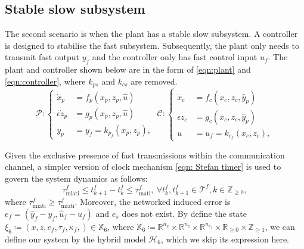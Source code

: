 \subsection{Stable slow subsystem}
The second scenario is when the plant has a stable slow subsystem. A controller is designed to stabilise the fast subsystem.
Subsequently, the plant only needs to transmit fast output $y_f$ and the controller only has fast control input $u_f$. 
The plant and controller shown below are in the form of \eqref{eqn:plant} and \eqref{eqn:controller}, where $k_{ps} $ and $k_{cs}$ are removed.
\begin{equation*}
    \mathcal{P}\!:\!
    \begin{cases}
    \dot x_p \!\!\!\!\!\!&= f_p(x_p, z_p,\hat u)\\
    \epsilon \dot z_p\!\!\!\!\!\! &= g_p(x_p, z_p, \hat u) \\
    y_p \!\!\!\!\!\!&= y_f = k_{p_f}(x_p,z_p)  , 
    \end{cases} \;
    \mathcal{C}\!:\!
    \begin{cases}
    \dot x_c \!\!\!\!\!\!&= f_c(x_c, z_c, \hat{y}_p)\\
    \epsilon \dot z_c \!\!\!\!\!\!&= g_c(x_c, z_c, \hat y_p) \\
    u \!\!\!\!\!\!&= u_f = k_{c_f}(x_c,z_c) ,
    \end{cases}
\end{equation*}

Given the exclusive presence of fast transmissions within the communication channel, a simpler version of clock mechanism \eqref{eqn: Stefan timer} is used to govern the system dynamics as follows:
\begin{equation*}
    \tau_{\text{miati}}^f \leq t_{k+1}^f - t_k^f \leq \tau_{\text{mati}}^f, \ \forall t_k^f, t_{k+1}^f\in \mathcal{T}^f, k \in \mathbb{Z}_{\geq 0},
\end{equation*}
where $\tau_{\text{miati}}^f \geq \tau_{\text{miati}}^f$. Moreover, the networked induced error is $e_f =  (\hat{y}_f - y_f, \hat{u}_f - u_f)$ and $e_s$ does not exist. By define the state $\xi_6 \coloneqq (x,z,e_f, \tau_f, \kappa_f,)\in \mathbb{X}_6$, where $\mathbb{X}_6\coloneqq \mathbb{R}^{n_x} \times \mathbb{R}^{n_z} \times \mathbb{R}^{n_{e_f}}\times  \mathbb{R}_{\geq 0} \times \mathbb{Z}_{\geq 1} $, we can define our system by the hybrid model $\mathcal{H}_6$, which we skip its expression here.


